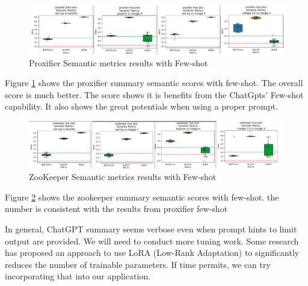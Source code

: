 \documentclass[conference]{IEEEtran}
\begin{document}
\begin{itemize}
    \begin{figure}[ht]
        \centering
        \includegraphics[width=\textwidth]{milestone4/proxifier_semantic_few_shot.png}
        \caption{Proxifier Semantic metrics results with Few-shot}
        \label{fig:psf}
    \end{figure} 
        
    Figure \ref{fig:psf} shows the proxifier summary semantic scores with few-shot. The overall score is much better. The score shows it is benefits from the ChatGpts' Few-shot capability. It also shows the great potentials when using a proper prompt.

    \begin{figure}[ht]
        \centering
        \includegraphics[width=\textwidth]{milestone4/zookeeper_semantics.png}
        \caption{ZooKeeper Semantic metrics results with Few-shot}
        \label{fig:zsf}
    \end{figure} 

    Figure \ref{fig:zsf} shows the zookeeper summary semantic scores with few-shot. the number is consistent with the results from proxifier few-shot
    
    In general, ChatGPT summary seems verbose even when prompt hints to limit output are provided. We will need to conduct more tuning work. Some research has proposed an approach to use LoRA (Low-Rank Adaptation) to significantly reduces the number of trainable
    parameters\cite{hu2021lora}. If time permits, we can try incorporating that into our application.

 \end{itemize}
    
\end{document}
